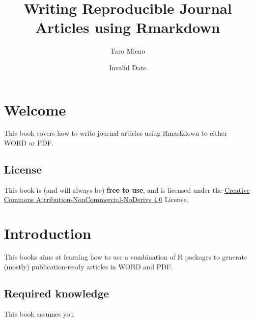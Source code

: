 \documentclass[
  letterpaper,
  DIV=11,
  numbers=noendperiod]{scrreprt}
\title{Writing Reproducible Journal Articles using Rmarkdown}
\author{Taro Mieno}
\date{Invalid Date}
\renewcommand*\contentsname{Table of contents}
\newcommand\contentsname{Table of contents}
\begin{document}
\maketitle
\ifdefined\Shaded\renewenvironment{Shaded}{\begin{tcolorbox}[enhanced, breakable, frame hidden, interior hidden, boxrule=0pt, sharp corners, borderline west={3pt}{0pt}{shadecolor}]}{\end{tcolorbox}}\fi

\renewcommand*\contentsname{Table of contents}
{
\hypersetup{linkcolor=}
\setcounter{tocdepth}{2}
\tableofcontents
}

\hypertarget{welcome}{%
\chapter*{Welcome}\label{welcome}}


This book covers how to write journal articles using Rmarkdown to either
WORD or PDF.

\hypertarget{license}{%
\section*{License}\label{license}}


This book is (and will always be) \textbf{free to use}, and is licensed
under the
\href{https://creativecommons.org/licenses/by-nc-nd/4.0/}{Creative
Commons Attribution-NonCommercial-NoDerivs 4.0} License.


\hypertarget{introduction}{%
\chapter{Introduction}\label{introduction}}

This books aims at learning how to use a combination of R packages to
generate (mostly) publication-ready articles in WORD and PDF.

\hypertarget{required-knowledge}{%
\section{Required knowledge}\label{required-knowledge}}

This book assumes you
\end{document}
